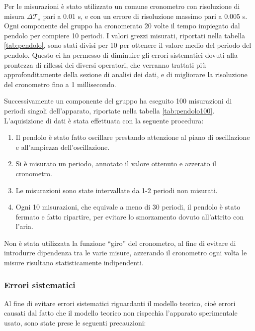 Per le misurazioni è stato utilizzato un comune cronometro con risoluzione di
misura $\Delta\mathcal{T}_{s}$ pari a 0.01 s, e con un errore di risoluzione massimo pari a 0.005 s. Ogni componente del gruppo ha
cronomerato 20 volte il tempo impiegato dal pendolo per compiere 10 periodi.
I valori grezzi misurati, riportati nella tabella \ref{tab:pendolo}, sono stati divisi per
10 per ottenere il valore medio del periodo del pendolo. Questo ci ha permesso
di diminuire gli errori sistematici dovuti alla prontezza di riflessi dei diversi
operatori, che verranno trattati più approfonditamente della sezione di analisi dei
dati, e di migliorare la risoluzione del cronometro fino a 1 millisecondo.

Successivamente un componente del gruppo ha eseguito 100 misurazioni di periodi
singoli dell'apparato, riportate nella tabella \ref{tab:pendolo100}. L'aquisizione di dati è stata
effettuata con la seguente procedura:

\begin{enumerate}
    \item{Il pendolo è stato fatto oscillare prestando attenzione al piano di oscillazione
        e all'ampiezza dell'oscillazione.}

    \item{Si è misurato un periodo, annotato il valore ottenuto e azzerato il cronometro.}

    \item{Le misurazioni sono state intervallate da 1-2 periodi non misurati.}

    \item{Ogni 10 misurazioni, che equivale a meno di 30 periodi, il pendolo è stato fermato
        e fatto ripartire, per evitare lo smorzamento dovuto all'attrito con l'aria.}
\end{enumerate}

Non è stata utilizzata la funzione ``giro'' del cronometro, al fine di evitare
di introdurre dipendenza tra le varie misure, azzerando il cronometro ogni 
volta le misure risultano statisticamente indipendenti.

\subsubsection{Errori sistematici}

Al fine di evitare errori sistematici riguardanti il modello teorico,
cioè errori causati dal fatto che il modello teorico non rispechia l'apparato
sperimentale usato, sono state prese le seguenti precauzioni:

